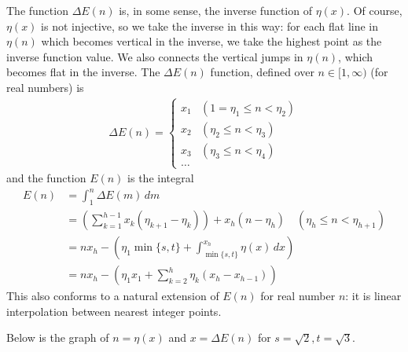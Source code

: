 \documentclass[]{article}
\begin{document}
The function $\Delta E(n)$ is, in some sense, the inverse function of $\eta(x)$. Of course, $\eta(x)$ is not injective, so we take the inverse in this way: for each flat line in $\eta(n)$ which becomes vertical in the inverse, we take the highest point as the inverse function value. We also connects the vertical jumps in $\eta(n)$, which becomes flat in the inverse. The $\Delta E(n)$ function, defined over $n \in [1, \infty)$ (for real numbers) is
\begin{align*}
\Delta E(n) = \begin{cases}
x_1 & (1 = \eta_1 \le n < \eta_2) \\
x_2 & (\eta_2 \le n < \eta_3) \\
x_3 & (\eta_3 \le n < \eta_4) \\
\dots
\end{cases}
\end{align*}
and the function $E(n)$ is the integral 
\begin{align*}
E(n) &= \int_1^n \Delta E(m)\, dm \\
 &= \left(\sum_{k = 1}^{h-1} x_k (\eta_{k+1} - \eta_k)\right) + x_{h} (n - \eta_{h}) \quad (\eta_{h} \le n < \eta_{h+1}) \\
 &= n x_h - \left(\eta_1 \min\{s, t\} + \int_{\min\{s, t\}}^{x_h} \eta(x)\, dx\right)\\
 &= n x_h  - \left(\eta_1 x_1 + \sum_{k=2}^{h} \eta_k (x_{h} - x_{h-1})\right)
\end{align*}
This also conforms to a natural extension of $E(n)$ for real number $n$: it is linear interpolation between nearest integer points.

Below is the graph of $n = \eta(x)$ and $x = \Delta E(n)$ for $s = \sqrt{2}, t = \sqrt{3}$.
\end{document}
